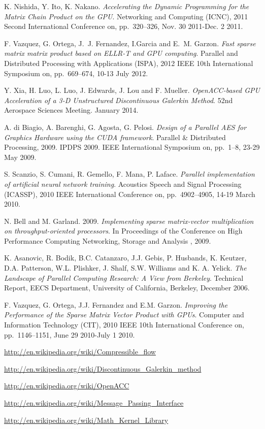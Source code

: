 \documentclass[11pt]{article}
\begin{document}
	
\begin{thebibliography}{99}

K. Nishida, Y. Ito, K. Nakano.
{\sl Accelerating the Dynamic Programming for the Matrix Chain Product on the GPU}.
Networking and Computing (ICNC), 2011 Second International Conference on, pp.~320--326, Nov. 30 2011-Dec. 2 2011.

F. Vazquez, G. Ortega, J.~J. Fernandez, I.Garcia and E.~M. Garzon.
{\sl Fast sparse matrix matrix product based on ELLR-T and GPU computing}.
Parallel and Distributed Processing with Applications (ISPA), 2012 IEEE 10th International Symposium on, pp.~669--674, 10-13 July 2012.

Y. Xia, H. Luo, L. Luo, J. Edwards, J. Lou and F. Mueller. 
{\sl OpenACC-based GPU Acceleration of a 3-D Unstructured Discontinuous Galerkin Method}.
52nd Aerospace Sciences Meeting. January 2014.


A. di Biagio, A. Barenghi, G. Agosta, G. Pelosi.
{\sl Design of a Parallel AES for Graphics Hardware using the CUDA framework}. 
Parallel \& Distributed Processing, 2009. IPDPS 2009. IEEE International Symposium on, pp.~1--8, 23-29 May 2009.

S. Scanzio, S. Cumani, R. Gemello, F. Mana, P. Laface.
{\sl Parallel implementation of artificial neural network training}.
Acoustics Speech and Signal Processing (ICASSP), 2010 IEEE International Conference on, pp.~4902--4905, 14-19 March 2010.

N. Bell and M. Garland. 2009. 
{\sl Implementing sparse matrix-vector multiplication on throughput-oriented processors}. 
In Proceedings of the Conference on High Performance Computing Networking, Storage and Analysis , 2009.

K. Asanovic, R. Bodik, B.C. Catanzaro, J.J. Gebis, P. Husbands,
K. Keutzer, D.A. Patterson, W.L. Plishker, J. Shalf, S.W. Williams and K. A. Yelick.
{\sl The Landscape of Parallel Computing Research: A View from Berkeley}.
Technical Report, EECS Department, University of California, Berkeley, December 2006.

F. Vazquez, G. Ortega, J.J. Fernandez and E.M. Garzon. 
{\sl Improving the Performance of the Sparse Matrix Vector Product with GPUs}. Computer and Information Technology (CIT), 2010 IEEE 10th International Conference on, pp.~1146--1151, June 29 2010-July 1 2010.

\url{http://en.wikipedia.org/wiki/Compressible_flow}

\url{http://en.wikipedia.org/wiki/Discontinuous_Galerkin_method}

\url{http://en.wikipedia.org/wiki/OpenACC}

\url{http://en.wikipedia.org/wiki/Message_Passing_Interface}

\url{http://en.wikipedia.org/wiki/Math_Kernel_Library}

\end{thebibliography}
\end{document}
